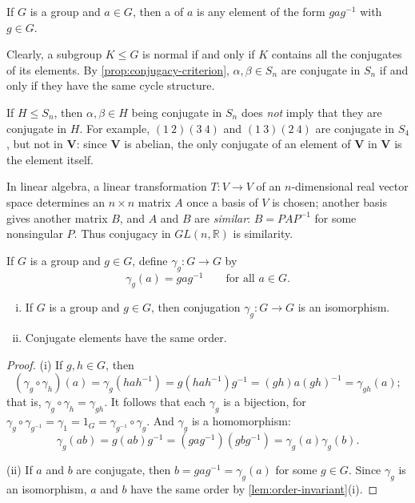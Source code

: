 \begin{definition}[Conjugate]
	If \(G\) is a group and \(a \in G\), then a  of \(a\) is any element of
	the form \(gag^{-1}\) with \(g \in G\).
\end{definition}

Clearly, a subgroup \(K \leq G\) is normal if and only if \(K\) contains all the conjugates
of its elements. By \autoref{prop:conjugacy-criterion}, \(\alpha, \beta \in S_n\) are
conjugate in \(S_n\) if and only if they have the same cycle structure.

\begin{remark}
	If \(H \leq S_n\), then \(\alpha, \beta \in H\) being conjugate in \(S_n\) does
	\emph{not} imply that they are conjugate in \(H\). For example, \((1\ 2)(3\ 4)\) and
	\((1\ 3)(2\ 4)\) are conjugate in \(S_4\), but not in \(\mathbf V\): since
	\(\mathbf V\) is abelian, the only conjugate of an element of \(\mathbf V\) in
	\(\mathbf V\) is the element itself.
\end{remark}

\begin{remark}[Similarity]
	In linear algebra, a linear transformation \(T\colon V \to V\) of an \(n\)-dimensional
	real vector space determines an \(n \times n\) matrix \(A\) once a basis of \(V\) is
	chosen; another basis gives another matrix \(B\), and \(A\) and \(B\) are
	\emph{similar}: \(B = PAP^{-1}\) for some nonsingular \(P\). Thus conjugacy in
	\(GL(n,\mathbb R)\) is similarity.
\end{remark}

\begin{definition}[Conjugation]
	If \(G\) is a group and \(g \in G\), define 
	\(\gamma_g\colon G \to G\) by
	\[
		\gamma_g(a) = gag^{-1} \qquad\text{for all } a \in G.
	\]
\end{definition}

\begin{proposition}\label{prop:conjugation-iso}
	\begin{enumerate}[(i)]
		\item If \(G\) is a group and \(g \in G\), then conjugation
		      \(\gamma_g\colon G \to G\) is an isomorphism.
		\item Conjugate elements have the same order.
	\end{enumerate}
\end{proposition}

\begin{proof}
	(i) If \(g, h \in G\), then
	\[
		(\gamma_g \circ \gamma_h)(a) = \gamma_g(hah^{-1}) = g(hah^{-1})g^{-1}
		= (gh)a(gh)^{-1} = \gamma_{gh}(a);
	\]
	that is, \(\gamma_g \circ \gamma_h = \gamma_{gh}\). It follows that each \(\gamma_g\) is
	a bijection, for \(\gamma_g \circ \gamma_{g^{-1}} = \gamma_1 = 1_G
	= \gamma_{g^{-1}} \circ \gamma_g\). And \(\gamma_g\) is a homomorphism:
	\[
		\gamma_g(ab) = g(ab)g^{-1} = (gag^{-1})(gbg^{-1}) = \gamma_g(a)\gamma_g(b).
	\]

	(ii) If \(a\) and \(b\) are conjugate, then \(b = gag^{-1} = \gamma_g(a)\) for some
	\(g \in G\). Since \(\gamma_g\) is an isomorphism, \(a\) and \(b\) have the same order by
	\autoref{lem:order-invariant}(i).
\end{proof}

